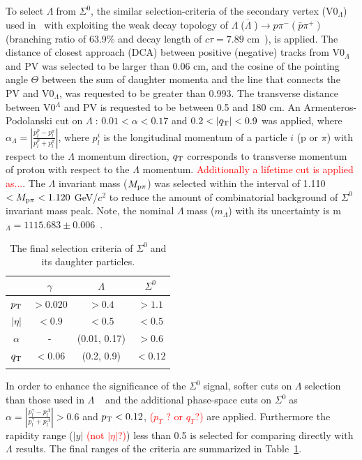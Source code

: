 \documentclass[ALICE,manyauthors]{cernphprep}
\newcommand{\sig}{\ensuremath{\Sigma^0  \; }}
\newcommand{\lam}{\ensuremath{\Lambda \; }}
\newcommand{\alam}{\ensuremath{\overline{\Lambda} \; }}
\newcommand{\red}{\textcolor{red}}
\begin{document}
To select \lam from $\Sigma^0$, the similar selection-criteria of the secondary vertex (V0$_{\Lambda}$) used 
in~\cite{cite:DDChin-Lam,cite:lambda_pp,cite:Lam-PLB14} with exploiting the weak decay topology
of \lam(\alam)$ \to p \pi^{-} (\bar{p} \pi^{+})$ (branching ratio of 63.9\% and decay length of
$c\tau = 7.89$ cm~\cite{cite:PDG}), is applied. The distance of closest approach (DCA) between 
positive (negative) tracks from V0$_\Lambda$ and PV was selected to be larger 
than 0.06 cm, and the cosine of the pointing angle $\Theta$ between the sum of daughter momenta and 
the line that connects the PV and V0$_\Lambda$, was requested to be greater than 0.993. The transverse 
distance between V0$^\Lambda$ and PV is requested to be between 0.5 and 180 cm. An 
Armenteros-Podolanski cut on \lam: $0.01 < \alpha < 0.17$ and $0.2 < |q_{\rm{T}}| < 0.9 $ 
was applied, where $\alpha_{\Lambda}  = |\frac{ p_l^{p} - p_l^{\pi}}{ p_l^{p} + p_l^{\pi} }  |$, where $p_l^i$ 
is the longitudinal momentum of a particle $i$ (p or $\pi$) 
with respect to the $\Lambda$ momentum direction, $q_{\rm{T}}$ corresponds to transverse momentum 
of proton with respect to the $\Lambda$ momentum. \red{Additionally a lifetime cut is applied as...}. 
The $\Lambda$ invariant mass ($M_{\rm{p}\pi}$) was selected 
within the interval of 1.110 $< M_{\rm{p}\pi}  < 1.120$ GeV/$c^2$ to reduce the amount of combinatorial 
background of \sig invariant mass peak. Note, the nominal \lam mass ($m_\Lambda$) with its uncertainty is m$_\Lambda=1115.683 \pm 0.006$~\cite{cite:PDG}.

\begin{table}[h!]
\centering
\begin{tabular}{c| cc| c}
 & $\gamma$ & $\Lambda$ & $\Sigma^0$ \\
\hline\noalign{\smallskip}
$p_{\rm{T}}$ & $> 0.020$ & $>0.4$ & $> 1.1$ \\
$|\eta|$ & $< 0.9$ & $< 0.5$ & $< 0.5$ \\
$\alpha$ & - & (0.01, 0.17) & $>0.6$ \\
$q_{\rm{T}}$ & $< 0.06$ & (0.2, 0.9) & $< 0.12$ \\
\hline\noalign{\smallskip}
\end{tabular}
\caption{The final selection criteria of \sig and its daughter particles.}
\label{tab:selection}    
\end{table} 

In order to enhance the significance of the \sig signal, softer cuts on \lam selection than those used in 
\lam~\cite{cite:lambda_pp,cite:Lam-PLB14} and the additional phase-space cuts on \sig as
$\alpha  = |\frac{ p_l^{\gamma} - p_l^{\Lambda} }{ p_l^{\gamma} + p_l^{\Lambda} } |>0.6$ and $p_{\rm{T}} < 0.12$,
\red{($p_T$ ? or $q_T$?)} are applied. Furthermore the rapidity range ($|y|$ \red{(not $|\eta|$?)}) less 
than 0.5 is selected for comparing directly with $\Lambda$ results. The final ranges of the criteria are summarized 
in Table~\ref{tab:selection}.
\end{document}

